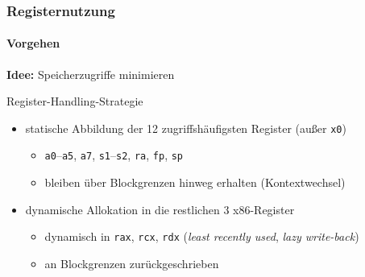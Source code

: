 \begin{frame}
	\frametitle{Registernutzung}
	\framesubtitle{Vorgehen}
	
	\textbf{Idee:} Speicherzugriffe minimieren
	
	\vspace{0.50cm}
	
	\pause
	\begin{block}{Register-Handling-Strategie}
		\begin{itemize}
			\item statische Abbildung der 12 zugriffshäufigsten Register (außer \texttt{x0})
			\begin{itemize}
				\item \texttt{a0}--\texttt{a5}, \texttt{a7}, \texttt{s1}--\texttt{s2}, \texttt{ra}, \texttt{fp}, \texttt{sp}
				\item bleiben über Blockgrenzen hinweg erhalten ( Kontextwechsel)
			\end{itemize}
			
			\pause
			\item dynamische Allokation in die restlichen 3 x86-Register
			\begin{itemize}
				\item dynamisch in \texttt{rax}, \texttt{rcx}, \texttt{rdx} (\textit{least recently used}, \textit{lazy write-back})
				\item an Blockgrenzen zurückgeschrieben
			\end{itemize}
		\end{itemize}
	\end{block}
	
\end{frame}



